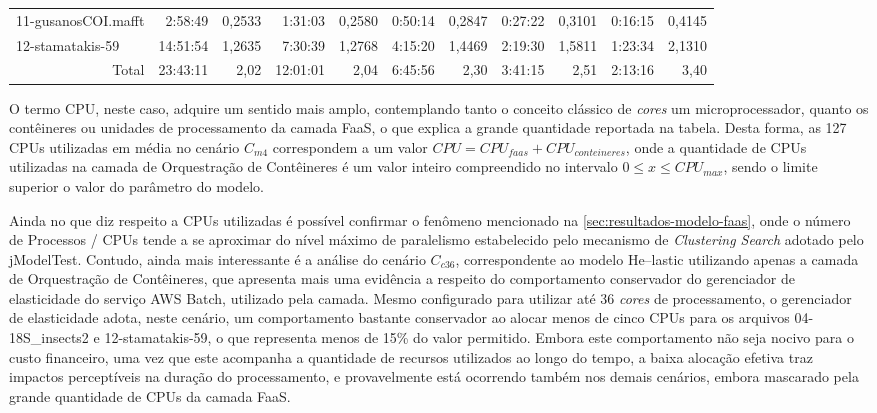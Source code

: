\documentclass[english,brazilian]{UNISINOSmonografia} %
\begin{document}
{\begin{landscape}
\begin{table}
\begin{minipage}{1.1\linewidth}
\begin{tabular*}{\linewidth}{@{\extracolsep{\fill}}lrrrrrrrrrr@{}}
					11-gusanosCOI.mafft & 2:58:49 & 0,2533 & 1:31:03 & 0,2580 & 0:50:14 & 0,2847 & 0:27:22 & 0,3101 & 0:16:15 & 0,4145 \\
					12-stamatakis-59 & 14:51:54 & 1,2635 & 7:30:39 & 1,2768 & 4:15:20 & 1,4469 & 2:19:30 & 1,5811 & 1:23:34 & 2,1310 \\
					\bottomrule
					\multicolumn{1}{r}{Total} & 23:43:11 & 2,02 & 12:01:01 & 2,04 & 6:45:56 & 2,30 & 3:41:15 & 2,51 & 2:13:16 & 3,40
				\end{tabular*}
			\end{minipage}
		\end{table}
	\end{landscape}
}



O termo CPU, neste caso, adquire um sentido mais amplo, contemplando tanto o conceito clássico de \textit{cores} um microprocessador, quanto os contêineres ou unidades de processamento da camada FaaS, o que explica a grande quantidade reportada na tabela.
%
Desta forma, as 127 CPUs utilizadas em média no cenário $C_{m4}$ correspondem a um valor $ CPU = CPU_{faas} + CPU_{conteineres} $, onde a quantidade de CPUs utilizadas na camada de Orquestração de Contêineres é um valor inteiro compreendido no intervalo $ 0 \le x \le CPU_{max} $, sendo o limite superior o valor do parâmetro do modelo.





Ainda no que diz respeito a CPUs utilizadas é possível confirmar o fenômeno mencionado na \autoref{sec:resultados-modelo-faas}, onde o número de Processos / CPUs tende a se aproximar do nível máximo de paralelismo estabelecido pelo mecanismo de \textit{Clustering Search} adotado pelo jModelTest.
%
Contudo, ainda mais interessante é a análise do cenário $C_{c36}$, correspondente ao modelo \textsf{He}--lastic utilizando apenas a camada de Orquestração de Contêineres, que apresenta mais uma evidência a respeito do comportamento conservador do gerenciador de elasticidade do serviço AWS Batch, utilizado pela camada.
%
Mesmo configurado para utilizar até 36 \textit{cores} de processamento, o gerenciador de elasticidade adota, neste cenário, um comportamento bastante conservador ao alocar menos de cinco CPUs para os arquivos 04-18S\_insects2 e 12-stamatakis-59, o que representa menos de 15\% do valor permitido.
%
Embora este comportamento não seja nocivo para o custo financeiro, uma vez que este acompanha a quantidade de recursos utilizados ao longo do tempo, a baixa alocação efetiva traz impactos perceptíveis na duração do processamento, e provavelmente está ocorrendo também nos demais cenários, embora mascarado pela grande quantidade de CPUs da camada FaaS.
\end{document}
